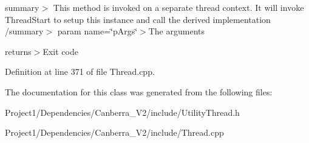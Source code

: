 summary$>$ This method is invoked on a separate thread context. It will invoke Thread\+Start to setup this instance and call the derived implementation /summary$>$ param name=\char`\"{}p\+Args\char`\"{}$>$The arguments

returns$>$Exit code

Definition at line 371 of file Thread.\+cpp.



The documentation for this class was generated from the following files\+:\begin{DoxyCompactItemize}
\item 
Project1/\+Dependencies/\+Canberra\+\_\+\+V2/include/Utility\+Thread.\+h\item 
Project1/\+Dependencies/\+Canberra\+\_\+\+V2/include/Thread.\+cpp\end{DoxyCompactItemize}
